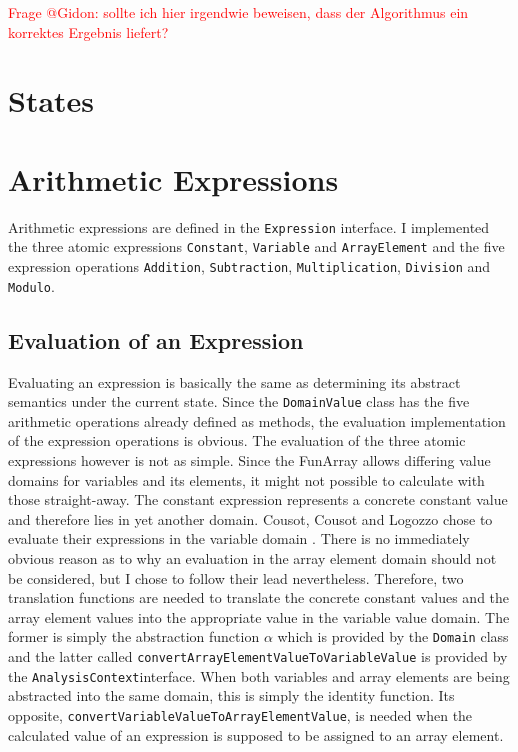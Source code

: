 \documentclass{report}
\begin{document}
\noindent\textcolor{red}{Frage @Gidon: sollte ich hier irgendwie beweisen, dass der Algorithmus ein korrektes Ergebnis liefert?}
\section{States}
\section{Arithmetic Expressions}\label{sec:expressions}

Arithmetic expressions are defined in the \texttt{Expression} interface. I implemented the three atomic expressions \texttt{Constant}, \texttt{Variable} and \texttt{ArrayElement} and the five expression operations \texttt{Addition}, \texttt{Subtraction}, \texttt{Multiplication}, \texttt{Division} and \texttt{Modulo}. 

\subsection{Evaluation of an Expression}\label{sec:expressions:evaluation}
Evaluating an expression is basically the same as determining its abstract semantics under the current state. Since the \texttt{DomainValue} class has the five arithmetic operations already defined as methods, the evaluation implementation of the expression operations is obvious. The evaluation of the three atomic expressions however is not as simple. Since the FunArray allows differing value domains for variables and its elements, it might not possible to calculate with those straight-away. The constant expression represents a concrete constant value and therefore lies in yet another domain. Cousot, Cousot and Logozzo chose to evaluate their expressions in the variable domain \cite{cousot2011}. There is no immediately obvious reason as to why an evaluation in the array element domain should not be considered, but I chose to follow their lead nevertheless. Therefore, two translation functions are needed to translate the concrete constant values and the array element values into the appropriate value in the variable value domain. The former is simply the abstraction function $\alpha$ which is provided by the \texttt{Domain} class and the latter called \texttt{convert\allowbreak{}Array\allowbreak{}Element\allowbreak{}Value\allowbreak{}To\allowbreak{}Variable\allowbreak{}Value} is provided by the \texttt{AnalysisContext}interface. When both variables and array elements are being abstracted into the same domain, this is simply the identity function. Its opposite, \texttt{convert\allowbreak{}Variable\allowbreak{}Value\allowbreak{}ToArray\allowbreak{}Element\allowbreak{}Value}, is needed when the calculated value of an expression is supposed to be assigned to an array element.
\end{document}
